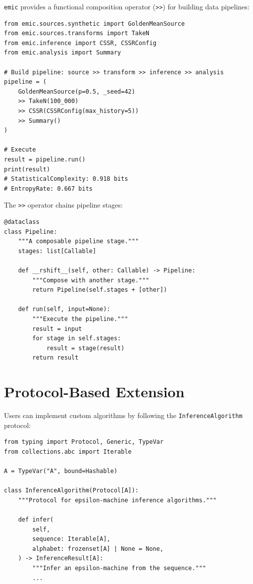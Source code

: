 \documentclass[11pt,a4paper]{report}
\theoremstyle{definition}
\theoremstyle{plain}
\newcommand{\emic}{\texttt{emic}}
\begin{document}
\emic{} provides a functional composition operator (\texttt{>>}) for building data pipelines:

\begin{lstlisting}[caption={Pipeline composition example}]
from emic.sources.synthetic import GoldenMeanSource
from emic.sources.transforms import TakeN
from emic.inference import CSSR, CSSRConfig
from emic.analysis import Summary

# Build pipeline: source >> transform >> inference >> analysis
pipeline = (
    GoldenMeanSource(p=0.5, _seed=42)
    >> TakeN(100_000)
    >> CSSR(CSSRConfig(max_history=5))
    >> Summary()
)

# Execute
result = pipeline.run()
print(result)
# StatisticalComplexity: 0.918 bits
# EntropyRate: 0.667 bits
\end{lstlisting}

The \texttt{>>} operator chains pipeline stages:

\begin{lstlisting}[caption={Pipeline operator implementation}]
@dataclass
class Pipeline:
    """A composable pipeline stage."""
    stages: list[Callable]

    def __rshift__(self, other: Callable) -> Pipeline:
        """Compose with another stage."""
        return Pipeline(self.stages + [other])

    def run(self, input=None):
        """Execute the pipeline."""
        result = input
        for stage in self.stages:
            result = stage(result)
        return result
\end{lstlisting}

\section{Protocol-Based Extension}

Users can implement custom algorithms by following the \texttt{InferenceAlgorithm} protocol:

\begin{lstlisting}[caption={InferenceAlgorithm protocol}]
from typing import Protocol, Generic, TypeVar
from collections.abc import Iterable

A = TypeVar("A", bound=Hashable)

class InferenceAlgorithm(Protocol[A]):
    """Protocol for epsilon-machine inference algorithms."""

    def infer(
        self,
        sequence: Iterable[A],
        alphabet: frozenset[A] | None = None,
    ) -> InferenceResult[A]:
        """Infer an epsilon-machine from the sequence."""
        ...
\end{lstlisting}
\end{document}
